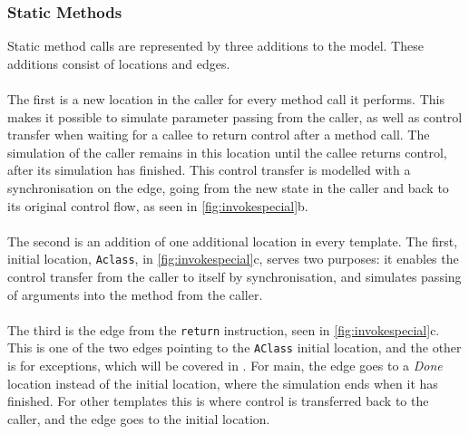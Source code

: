 \subsubsection{Static Methods}
Static method calls are represented by three additions to the model. These additions consist of locations and edges.\\\\ 
The first is a new location in the caller for every method call it performs. This makes it possible to simulate parameter passing from the caller, as well as control transfer when waiting for a callee to return control after a method call. The simulation of the caller remains in this location until the callee returns control, after its simulation has finished. This control transfer is modelled with a synchronisation on the edge, going from the new state in the caller and back to its original control flow, as seen in \cref{fig:invokespecial}b.\\\\
The second is an addition of one additional location in every template. The first, initial location, \texttt{Aclass}, in \cref{fig:invokespecial}c, serves two purposes: it enables the control transfer from the caller to itself by synchronisation, and simulates passing of arguments into the method from the caller.\\\\
The third is the edge from the \texttt{return} instruction, seen in \cref{fig:invokespecial}c. This is one of the two edges pointing to the \texttt{AClass} initial location, and the other is for exceptions, which will be covered in . For main, the edge goes to a \textit{Done} location instead of the initial location, where the simulation ends when it has finished. For other templates this is where control is transferred back to the caller, and the edge goes to the initial location.


